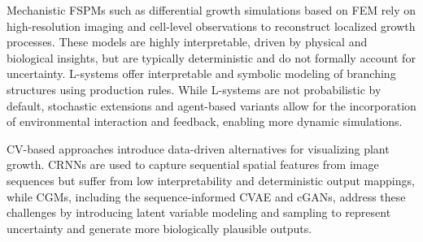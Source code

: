 \documentclass{article}
\begin{document}
Mechanistic FSPMs such as differential growth simulations based on FEM rely on high-resolution imaging and cell-level observations to reconstruct localized growth processes. These models are highly interpretable, driven by physical and biological insights, but are typically deterministic and do not formally account for uncertainty. 
L-systems offer interpretable and symbolic modeling of branching structures using production rules. While L-systems are not probabilistic by default, stochastic extensions and agent-based variants allow for the incorporation of environmental interaction and feedback, enabling more dynamic simulations.


CV-based approaches introduce data-driven alternatives for visualizing plant growth. CRNNs are used to capture sequential spatial features from image sequences but suffer from low interpretability and deterministic output mappings, while CGMs, including the sequence-informed CVAE and cGANs, address these challenges by introducing latent variable modeling and sampling to represent uncertainty and generate more biologically plausible outputs.
\end{document}

